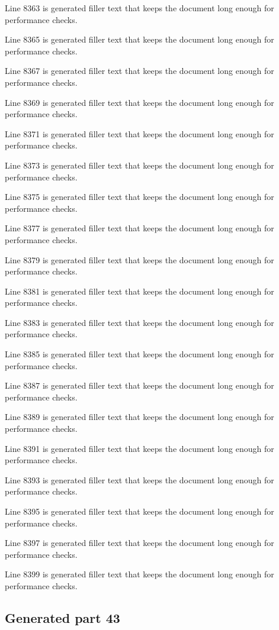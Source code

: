 Line 8363 is generated filler text that keeps the document long enough for performance checks.

Line 8365 is generated filler text that keeps the document long enough for performance checks.

Line 8367 is generated filler text that keeps the document long enough for performance checks.

Line 8369 is generated filler text that keeps the document long enough for performance checks.

Line 8371 is generated filler text that keeps the document long enough for performance checks.

Line 8373 is generated filler text that keeps the document long enough for performance checks.

Line 8375 is generated filler text that keeps the document long enough for performance checks.

Line 8377 is generated filler text that keeps the document long enough for performance checks.

Line 8379 is generated filler text that keeps the document long enough for performance checks.

Line 8381 is generated filler text that keeps the document long enough for performance checks.

Line 8383 is generated filler text that keeps the document long enough for performance checks.

Line 8385 is generated filler text that keeps the document long enough for performance checks.

Line 8387 is generated filler text that keeps the document long enough for performance checks.

Line 8389 is generated filler text that keeps the document long enough for performance checks.

Line 8391 is generated filler text that keeps the document long enough for performance checks.

Line 8393 is generated filler text that keeps the document long enough for performance checks.

Line 8395 is generated filler text that keeps the document long enough for performance checks.

Line 8397 is generated filler text that keeps the document long enough for performance checks.

Line 8399 is generated filler text that keeps the document long enough for performance checks.

\subsection{Generated part 43}

